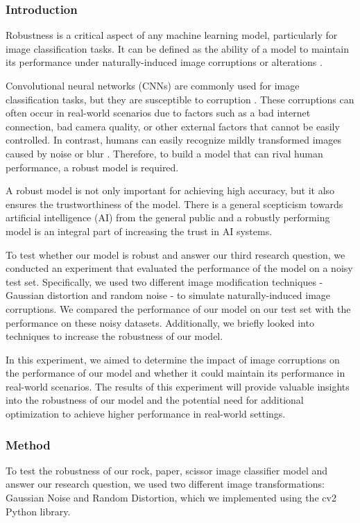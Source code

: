 \documentclass[a4paper]{article}
\begin{document}
\subsubsection{Introduction}
Robustness is a critical aspect of any machine learning model, particularly for image classification tasks. It can be defined as the ability of a model to maintain its performance under naturally-induced image corruptions or alterations \citep{robustness}.

Convolutional neural networks (CNNs) are commonly used for image classification tasks, but they are susceptible to corruption \citep{corruption}. These corruptions can often occur in real-world scenarios due to factors such as a bad internet connection, bad camera quality, or other external factors that cannot be easily controlled. In contrast, humans can easily recognize mildly transformed images caused by noise or blur \citep{corruption}. Therefore, to build a model that can rival human performance, a robust model is required.

A robust model is not only important for achieving high accuracy, but it also ensures the trustworthiness of the model. There is a general scepticism towards artificial intelligence (AI) from the general public \citep{AITrust} and a robustly performing model is an integral part of increasing the trust in AI systems.

To test whether our model is robust and answer our third research question, we conducted an experiment that evaluated the performance of the model on a noisy test set. Specifically, we used two different image modification techniques - Gaussian distortion and random noise - to simulate naturally-induced image corruptions. We compared the performance of our model on our test set with the performance on these noisy datasets. Additionally, we briefly looked into techniques to increase the robustness of our model.

In this experiment, we aimed to determine the impact of image corruptions on the performance of our model and whether it could maintain its performance in real-world scenarios. The results of this experiment will provide valuable insights into the robustness of our model and the potential need for additional optimization to achieve higher performance in real-world settings.

\subsubsection{Method}
To test the robustness of our rock, paper, scissor image classifier model and answer our research question, we used two different image transformations: Gaussian Noise and Random Distortion, which we implemented using the cv2 Python library.
\end{document}

